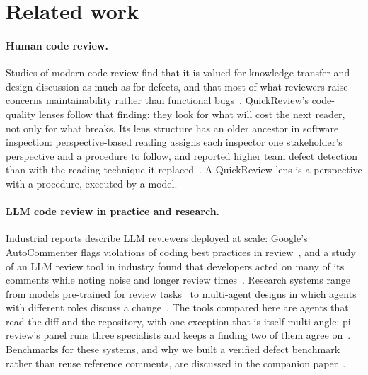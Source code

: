 \documentclass[11pt,a4paper]{article}
\newcommand{\qcr}{QuickReview}
\begin{document}
\section{Related work}
\label{sec:related}

\paragraph{Human code review.} Studies of modern code review find that it
is valued for knowledge transfer and design discussion as much as for
defects, and that most of what reviewers raise concerns maintainability
rather than functional bugs~\cite{bacchelli2013,mantyla2009,sadowski2018}.
\qcr{}'s code-quality lenses follow that finding: they look for what will
cost the next reader, not only for what breaks. Its lens structure has an
older ancestor in software inspection: perspective-based reading assigns
each inspector one stakeholder's perspective and a procedure to follow, and
reported higher team defect detection than with the reading technique it
replaced~\cite{basili1996}. A \qcr{} lens is a
perspective with a procedure, executed by a model.

\paragraph{LLM code review in practice and research.} Industrial reports
describe LLM reviewers deployed at scale: Google's AutoCommenter flags
violations of coding best practices in review~\cite{autocommenter}, and a
study of an LLM review tool in industry found that developers acted on many
of its comments while noting noise and longer review times~\cite{cihan2025}.
Research systems range from models pre-trained for review
tasks~\cite{codereviewer} to multi-agent designs in which agents with
different roles discuss a change~\cite{codeagent}. The tools compared here
are agents that read the diff and the repository, with one exception that
is itself multi-angle: pi-review's panel runs three specialists and keeps a
finding two of them agree on~\cite{pireview}. Benchmarks for these systems,
and why we built a verified defect benchmark rather than reuse reference
comments, are discussed in the companion paper~\cite{qcrbench}.
\end{document}
